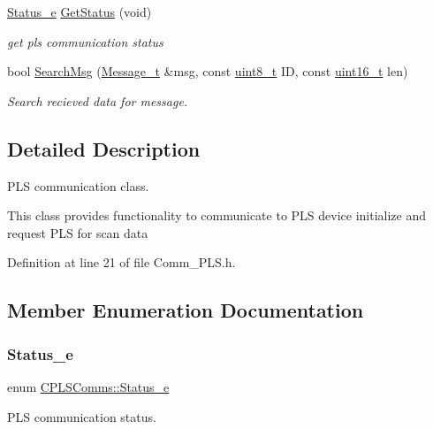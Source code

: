 \begin{DoxyCompactItemize}
\mbox{\hyperlink{class_c_p_l_s_comms_a765bc36363f75f4faf4fd2b41d440159}{Status\+\_\+e}} \mbox{\hyperlink{class_c_p_l_s_comms_a05149da99ab80b804699763111315f33}{Get\+Status}} (void)
\begin{DoxyCompactList}\small\item\em get pls communication status \end{DoxyCompactList}\item 
bool \mbox{\hyperlink{class_c_p_l_s_comms_a14754b4119b9a3d613579c2a80220cc0}{Search\+Msg}} (\mbox{\hyperlink{struct_c_p_l_s_comms_1_1_message__t}{Message\+\_\+t}} \&msg, const \mbox{\hyperlink{_a_d_a_s___types_8h_aba7bc1797add20fe3efdf37ced1182c5}{uint8\+\_\+t}} ID, const \mbox{\hyperlink{_a_d_a_s___types_8h_a1f1825b69244eb3ad2c7165ddc99c956}{uint16\+\_\+t}} len)
\begin{DoxyCompactList}\small\item\em Search recieved data for message. \end{DoxyCompactList}\end{DoxyCompactItemize}


\subsection{Detailed Description}
P\+LS communication class. 

This class provides functionality to communicate to P\+LS device initialize and request P\+LS for scan data 

Definition at line 21 of file Comm\+\_\+\+P\+L\+S.\+h.



\subsection{Member Enumeration Documentation}
\mbox{\label{class_c_p_l_s_comms_a765bc36363f75f4faf4fd2b41d440159}} 
\subsubsection{\texorpdfstring{Status\_e}{Status\_e}}
{\footnotesize\ttfamily enum \mbox{\hyperlink{class_c_p_l_s_comms_a765bc36363f75f4faf4fd2b41d440159}{C\+P\+L\+S\+Comms\+::\+Status\+\_\+e}}}



P\+LS communication status. 

